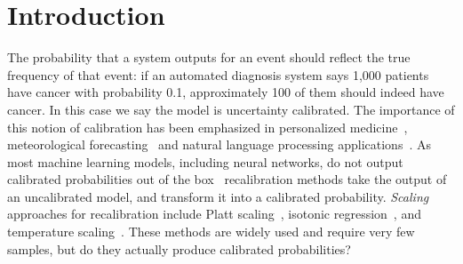 \section{Introduction}

The probability that a system outputs for an event should reflect the true frequency of that event: if an automated diagnosis system says 1,000 patients have cancer with probability 0.1, approximately 100 of them should indeed have cancer.
In this case we say the model is uncertainty calibrated. The importance of this notion of calibration has been emphasized in personalized medicine~\cite{jiang2012calibrating}, meteorological forecasting~\cite{brocker2009decomposition} and natural language processing applications~\cite{nguyen2015posterior}.
As most machine learning models, including neural networks, do not output calibrated probabilities out of the box~\cite{guo2017calibration, zadrozny2001calibrated} recalibration methods take the output of an uncalibrated model, and transform it into a calibrated probability.
\emph{Scaling} approaches for recalibration include Platt scaling~\cite{platt1999probabilistic}, isotonic regression~\cite{zadrozny2002transforming}, and temperature scaling~\cite{guo2017calibration}. These methods are widely used and require very few samples, but do they actually produce calibrated probabilities?

